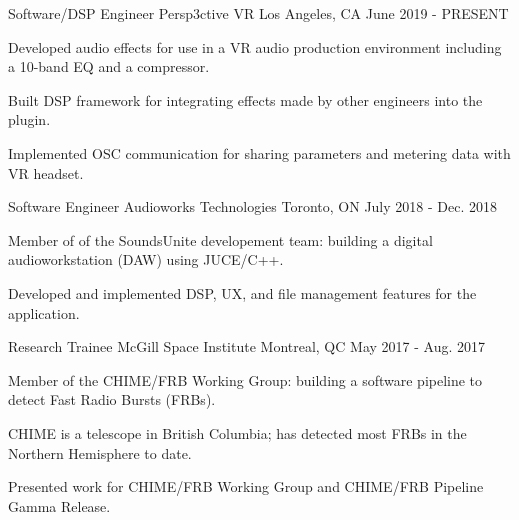 

\begin{cventries}

    \cventry
    {Software/DSP Engineer} %
    {Persp3ctive VR} %
    {Los Angeles, CA} %
    {June 2019 - PRESENT} %
    {
      \begin{cvitems} %
        \item {Developed audio effects for use in a VR audio production environment
               including a 10-band EQ and a compressor.}
        \item {Built DSP framework for integrating effects made by other engineers into the plugin.}
        \item {Implemented OSC communication for sharing parameters and metering data with VR headset.}
      \end{cvitems}
    }

    \cventry
    {Software Engineer} %
    {Audioworks Technologies} %
    {Toronto, ON} %
    {July 2018 - Dec. 2018} %
    {
      \begin{cvitems} %
        \item {Member of of the SoundsUnite developement team: building a digital audioworkstation (DAW) using JUCE/C++.}
        \item {Developed and implemented DSP, UX, and file management features for the application.}
      \end{cvitems}
    }

  \cventry
    {Research Trainee} %
    {McGill Space Institute} %
    {Montreal, QC} %
    {May 2017 - Aug. 2017} %
    {
      \begin{cvitems} %
        \item {Member of the CHIME/FRB Working Group: building a software pipeline to detect Fast Radio Bursts (FRBs).}
        \item {CHIME is a telescope in British Columbia; has detected most FRBs in the Northern Hemisphere to date.}
        \item {Presented work for CHIME/FRB Working Group and CHIME/FRB Pipeline Gamma Release.}
      \end{cvitems}
    }


\end{cventries}
